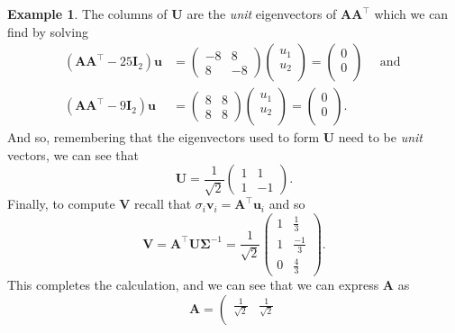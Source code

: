 \documentclass[
]{book}
\theoremstyle{definition}
\theoremstyle{definition}
\newtheorem{example}{Example}[chapter]
\theoremstyle{definition}
\theoremstyle{definition}
\theoremstyle{remark}
\begin{document}
\begin{example}
The columns of \(\mathbf U\) are the \emph{unit} eigenvectors of \(\mathbf A\mathbf A^\top\) which we can find by solving
\begin{align*}(\mathbf A\mathbf A^\top-25\mathbf I_2)\mathbf u&=\left(\begin{array}{cc}-8&8\\
               8&-8\end{array}\right)\left(\begin{array}{c}u_1\\u_2\\\end{array}\right)=\left(\begin{array}{c}0\\0\\\end{array}\right) \quad \mbox{ and }\\ (\mathbf A\mathbf A^\top-9\mathbf I_2)\mathbf u&=\left(\begin{array}{cc}8&8\\
               8&8\end{array}\right)\left(\begin{array}{c}u_1\\u_2\\\end{array}\right)=\left(\begin{array}{c}0\\0\\\end{array}\right).\end{align*}
And so, remembering that the eigenvectors used to form \(\mathbf U\) need to be \emph{unit} vectors, we can see that
\[\mathbf U=\frac{1}{\sqrt{2}}\left(\begin{array}{cc}1&1\\
               1&-1\end{array}\right).\]
Finally, to compute \(\mathbf V\) recall that \(\sigma_i \mathbf v_i = \mathbf A^\top \mathbf u_i\) and so
\[\mathbf V= \mathbf A^\top\mathbf U\boldsymbol{\Sigma}^{-1} = \frac{1}{\sqrt{2}}\left(\begin{array}{cc}1&\frac{1}{3}\\
                                                           1&\frac{-1}{3}\\
                                                           0&\frac{4}{3}\end{array}\right).
\]
This completes the calculation, and we can see that we can express \(\mathbf A\) as
\[\mathbf A= \left(\begin{array}{cc}\frac{1}{\sqrt{2}}&\frac{1}{\sqrt{2}}\\

\end{array}\]
\end{example}
\end{document}
